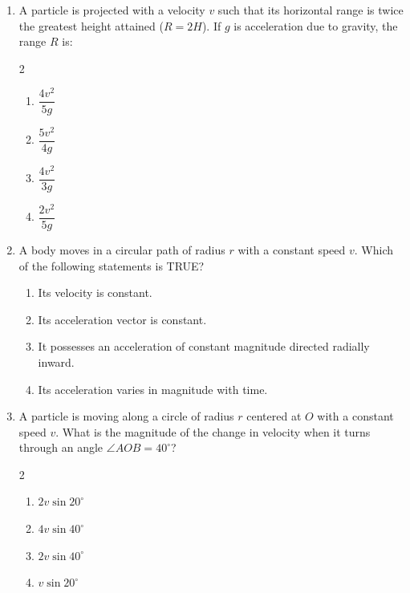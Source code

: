 \documentclass[11pt,a4paper]{article}
\begin{document}
\begin{enumerate}[label=\textbf{\textcolor{l1Green}{Q\arabic*.}},leftmargin=24pt,itemsep=10pt]
  \item A particle is projected with a velocity $v$ such that its horizontal range is twice the greatest height attained ($R = 2H$). If $g$ is acceleration due to gravity, the range $R$ is:
  \begin{multicols}{2}
  \begin{enumerate}[label=\textbf{\textcolor{primaryDark}{(\Alph*)}},itemsep=2pt]
    \item $\dfrac{4v^2}{5g}$
    \item $\dfrac{5v^2}{4g}$
    \item $\dfrac{4v^2}{3g}$
    \item $\dfrac{2v^2}{5g}$
  \end{enumerate}
  \end{multicols}

  \item A body moves in a circular path of radius $r$ with a constant speed $v$. Which of the following statements is TRUE?
  \begin{enumerate}[label=\textbf{\textcolor{primaryDark}{(\Alph*)}},itemsep=2pt]
    \item Its velocity is constant.
    \item Its acceleration vector is constant.
    \item It possesses an acceleration of constant magnitude directed radially inward.
    \item Its acceleration varies in magnitude with time.
  \end{enumerate}

  \item A particle is moving along a circle of radius $r$ centered at $O$ with a constant speed $v$. What is the magnitude of the change in velocity when it turns through an angle $\angle AOB = 40^\circ$?
  \begin{multicols}{2}
  \begin{enumerate}[label=\textbf{\textcolor{primaryDark}{(\Alph*)}},itemsep=2pt]
    \item $2v\sin 20^\circ$
    \item $4v\sin 40^\circ$
    \item $2v\sin 40^\circ$
    \item $v\sin 20^\circ$
  \end{enumerate}
  \end{multicols}


\end{enumerate}
\end{document}
